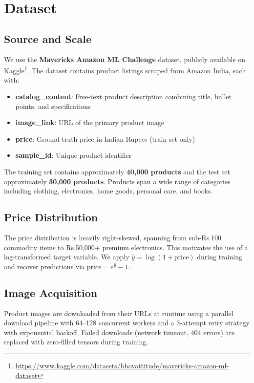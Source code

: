 \documentclass[conference]{IEEEtran}
\begin{document}
\section{Dataset}

\subsection{Source and Scale}
We use the \textbf{Mavericks Amazon ML Challenge} dataset, publicly available on Kaggle\footnote{\url{https://www.kaggle.com/datasets/bboyattitude/mavericks-amazon-ml-dataset}}. The dataset contains product listings scraped from Amazon India, each with:

\begin{itemize}
    \item \textbf{catalog\_content}: Free-text product description combining title, bullet points, and specifications
    \item \textbf{image\_link}: URL of the primary product image
    \item \textbf{price}: Ground truth price in Indian Rupees (train set only)
    \item \textbf{sample\_id}: Unique product identifier
\end{itemize}

The training set contains approximately \textbf{40,000 products} and the test set approximately \textbf{30,000 products}. Products span a wide range of categories including clothing, electronics, home goods, personal care, and books.

\subsection{Price Distribution}
The price distribution is heavily right-skewed, spanning from sub-Rs.100 commodity items to Rs.50,000+ premium electronics. This motivates the use of a log-transformed target variable. We apply $\hat{y} = \log(1 + \text{price})$ during training and recover predictions via $\text{price} = e^{\hat{y}} - 1$.

\subsection{Image Acquisition}
Product images are downloaded from their URLs at runtime using a parallel download pipeline with 64--128 concurrent workers and a 3-attempt retry strategy with exponential backoff. Failed downloads (network timeout, 404 errors) are replaced with zero-filled tensors during training.
\end{document}

